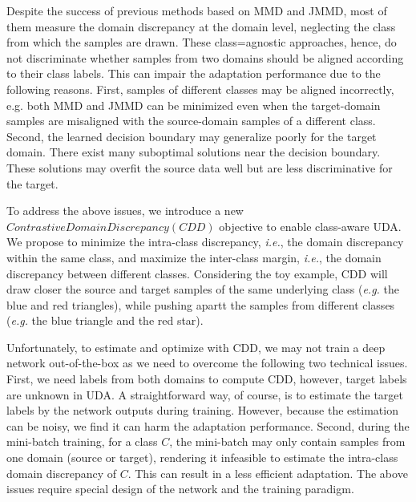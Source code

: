 \documentclass[conference]{IEEEtran}
\begin{document}
Despite the success of previous methods based on MMD and JMMD, most of them measure the domain discrepancy at the domain level, neglecting the class from which the samples are drawn.
These class=agnostic approaches, hence, do not discriminate whether samples  from two domains should be aligned according to their class labels.
This can impair the adaptation performance due to the following reasons. 
First, samples of different classes may be aligned incorrectly, e.g. both MMD and JMMD can be minimized even when the target-domain samples are misaligned with the source-domain samples of a different class.
Second, the learned decision boundary may generalize poorly for the target domain.
There exist many suboptimal solutions near the decision boundary. These solutions may overfit the source data well but are less discriminative for the target.

To address the above issues, we introduce a new $Contrastive Domain Discrepancy (CDD)$ objective to enable class-aware UDA.
We propose to minimize the intra-class discrepancy, \textit{i.e.}, the domain discrepancy within the same class, and maximize the inter-class margin, \textit{i.e.}, the domain discrepancy between different classes.
Considering the toy example, CDD will draw closer the source and target samples of the same underlying class (\textit{e.g.} the blue and red triangles), while pushing apartt the samples from different classes (\textit{e.g.} the blue triangle and the red star).

Unfortunately, to estimate and optimize with CDD, we may not train a deep network out-of-the-box as we need to overcome the following two technical issues. 
First, we need labels from both domains to compute CDD, however, target labels are unknown in UDA. 
A straightforward way, of course, is to estimate the target labels by the network outputs during training.
However, because the estimation can be noisy, we find it can harm the adaptation performance.
Second, during the mini-batch training, for a class $C$, the mini-batch may only contain samples from one domain (source or target), rendering it infeasible to estimate the intra-class domain discrepancy of $C$.
This can result in a less efficient adaptation. The above issues require special design of the network and the training paradigm.
\end{document}
